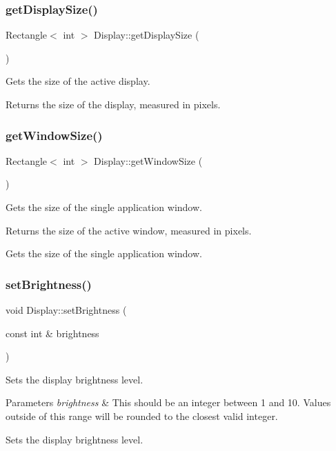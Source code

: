 \subsubsection{\texorpdfstring{get\+Display\+Size()}{getDisplaySize()}}
{\footnotesize\ttfamily Rectangle$<$ int $>$ Display\+::get\+Display\+Size (\begin{DoxyParamCaption}{ }\end{DoxyParamCaption})}

Gets the size of the active display.

\begin{DoxyReturn}{Returns}
the size of the display, measured in pixels. 
\end{DoxyReturn}
\mbox{\label{namespaceDisplay_afd822a7c63a9a91adba3c8db2b14e34a}} 
\subsubsection{\texorpdfstring{get\+Window\+Size()}{getWindowSize()}}
{\footnotesize\ttfamily Rectangle$<$ int $>$ Display\+::get\+Window\+Size (\begin{DoxyParamCaption}{ }\end{DoxyParamCaption})}

Gets the size of the single application window.

\begin{DoxyReturn}{Returns}
the size of the active window, measured in pixels.
\end{DoxyReturn}
Gets the size of the single application window. \mbox{\label{namespaceDisplay_a6965f1373908aadf49a66f4537835ed5}} 
\subsubsection{\texorpdfstring{set\+Brightness()}{setBrightness()}}
{\footnotesize\ttfamily void Display\+::set\+Brightness (\begin{DoxyParamCaption}\item[{const int \&}]{brightness }\end{DoxyParamCaption})}

Sets the display brightness level.


\begin{DoxyParams}{Parameters}
{\em brightness} & This should be an integer between 1 and 10. Values outside of this range will be rounded to the closest valid integer.\\
\hline
\end{DoxyParams}
Sets the display brightness level. 